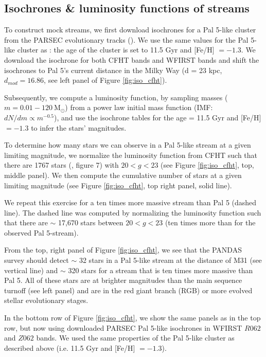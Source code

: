 \documentclass[twocolumn]{aastex62}
\newcommand{\msun}{\textrm{M}_\odot}
\begin{document}
\subsection{Isochrones \& luminosity functions of streams}
\label{sec:lum}
To construct mock streams, we first download isochrones for a Pal 5-like cluster from the PARSEC evolutionary tracks (\citealt{bressan12}). We use the same values for the Pal 5-like cluster as \citet{ibata17}: the age of the cluster is set to 11.5 Gyr and [Fe/H] $= -1.3$. We download the isochrone for both CFHT bands and WFIRST bands and shift the isochrones to Pal 5's current distance in the Milky Way (d = 23 kpc, $d_{mod} = 16.86$, see left panel of Figure \ref{fig:iso_cfht}). 

Subsequently, we compute a luminosity function, by sampling masses ($m = 0.01 - 120 ~\msun$) from a power law initial mass function (IMF: $dN/dm \propto m^{-0.5}$), and use the isochrone tables for the age = 11.5 Gyr and [Fe/H] $= -1.3$ to infer the stars' magnitudes. 

To determine how many stars we can observe in a Pal 5-like stream at a given limiting magnitude, we normalize the luminosity function from CFHT such that there are 1767 stars (\citealt{ibata16}, figure 7) with $20 < g < 23$ (see Figure \ref{fig:iso_cfht}, top, middle panel). We then compute the cumulative number of stars at a given limiting magnitude (see Figure \ref{fig:iso_cfht}, top right panel, solid line).

We repeat this exercise for a ten times more massive stream than Pal 5 (dashed line). The dashed line was computed by normalizing the luminosity function such that there are $\sim$ 17,670 stars between $20 < g < 23$ (ten times more than for the observed Pal 5-stream). 

From the top, right panel of Figure \ref{fig:iso_cfht}, we see that the PANDAS survey should detect $\sim$ 32 stars in a Pal 5-like stream at the distance of M31 (see vertical line) and $\sim$ 320 stars for a stream that is ten times more massive than Pal 5. All of these stars are at brighter magnitudes than the main sequence turnoff (see left panel) and are in the red giant branch (RGB) or more evolved stellar evolutionary stages. 

In the bottom row of Figure \ref{fig:iso_cfht}, we show the same panels as in the top row, but now using downloaded PARSEC Pal 5-like isochrones in WFIRST $R062$ and $Z062$ bands. We used the same properties of the Pal 5-like cluster as described above (i.e. 11.5 Gyr and [Fe/H] $= -1.3$). 
\end{document}
